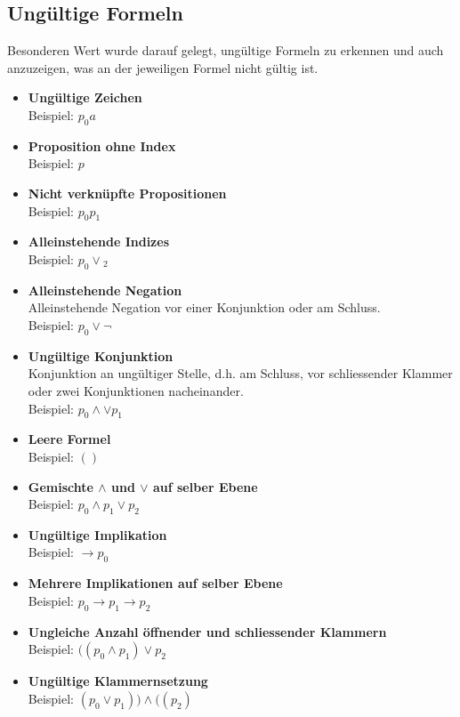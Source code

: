 \documentclass[11pt,a4paper,ngerman]{scrreprt}
\begin{document}
\subsection{Ungültige Formeln}
Besonderen Wert wurde darauf gelegt, ungültige Formeln zu erkennen und auch anzuzeigen, was an der jeweiligen Formel nicht gültig ist.
\begin{itemize}
\item \textbf{Ungültige Zeichen} \\
Beispiel: $p_0 a$
\item \textbf{Proposition ohne Index} \\
Beispiel: $p$
\item \textbf{Nicht verknüpfte Propositionen} \\
Beispiel: $p_0 p_1$
\item \textbf{Alleinstehende Indizes} \\
Beispiel: $p_0 \vee {}_2$
\item \textbf{Alleinstehende Negation} \\
Alleinstehende Negation vor einer Konjunktion oder am Schluss. \\
Beispiel: $p_0 \vee \neg$
\item \textbf{Ungültige Konjunktion} \\
Konjunktion an ungültiger Stelle, d.h. am Schluss, vor schliessender Klammer oder zwei Konjunktionen nacheinander. \\
Beispiel: $p_0 \wedge \vee p_1$
\item \textbf{Leere Formel} \\
Beispiel: $()$
\item \textbf{Gemischte $\wedge$ und $\vee$ auf selber Ebene} \\
Beispiel: $p_0 \wedge p_1 \vee p_2$
\item \textbf{Ungültige Implikation} \\
Beispiel: $\rightarrow p_0$
\item \textbf{Mehrere Implikationen auf selber Ebene} \\
Beispiel: $p_0 \rightarrow p_1 \rightarrow p_2$
\item \textbf{Ungleiche Anzahl öffnender und schliessender Klammern} \\
Beispiel: $((p_0 \wedge p_1) \vee p_2$
\item \textbf{Ungültige Klammernsetzung} \\
Beispiel: $(p_0 \vee p_1)) \wedge ((p_2)$
\end{itemize}
\end{document}
